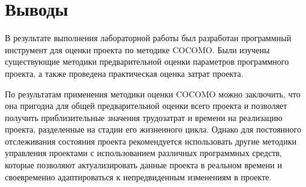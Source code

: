 \chapter{Выводы}

В результате выполнения лабораторной работы был разработан программный инструмент для оценки проекта по методике COCOMO. Были изучены существующие методики предварительной оценки параметров программного проекта, а также проведена практическая оценка затрат проекта.

По результатам применения методики оценки COCOMO можно заключить, что она пригодна для общей предварительной оценки всего проекта и позволяет получить приблизительные значения трудозатрат и времени на реализацию проекта, разделенные на стадии его жизненного цикла. Однако для постоянного отслеживания состояния проекта рекомендуется использовать другие методики управления проектами с использованием различных программных средств, которые позволяют актуализировать данные проекта в реальном времени и своевременно адаптироваться к непредвиденным изменениям в проекте.